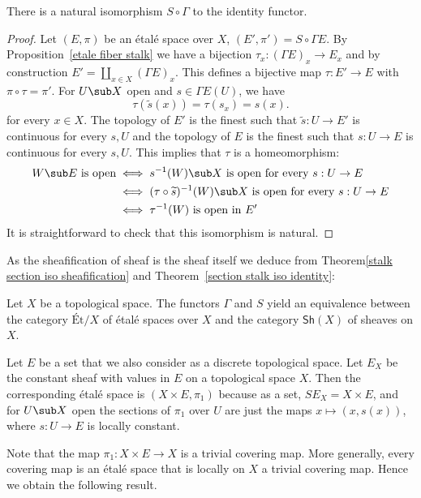 \begin{theorem}\label{section stalk iso identity}
There is a natural isomorphism $S\circ\Gamma$ to the identity functor.
\end{theorem}
\begin{proof}
Let $(E,\pi)$ be an étalé space over $X$, $(E',\pi')=S\circ\Gamma E$. By Proposition~\ref{etale fiber stalk} we have a bijection $\tau_x:(\Gamma E)_x\to E_x$ and by construction $E'=\coprod_{x\in X}(\Gamma E)_x$. This defines a bijective map $\tau:E'\to E$ with $\pi\circ\tau=\pi'$. For $U\sub X$ open and $s\in\Gamma E(U)$, we have 
\[\tau(\widetilde{s}(x))=\tau(s_x)=s(x).\] 
for every $x\in X$. The topology of $E'$ is the finest such that $\widetilde{s}:U\to E'$ is continuous for every $s,U$ and the topology of $E$ is the finest such that $s:U\to E$ is continuous for every $s,U$. This implies that $\tau$ is a homeomorphism:
\begin{align*}
W\sub E\text{ is open}&\iff s^{-1}(W)\sub X\text{ is open for every $s:U\to E$}\\
&\iff(\tau\circ\widetilde{s})^{-1}(W)\sub X\text{ is open for every $s:U\to E$}\\
&\iff\tau^{-1}(W)\text{ is open in $E'$}
\end{align*}
It is straightforward to check that this isomorphism is natural.
\end{proof}
As the sheafification of sheaf is the sheaf itself we deduce from Theorem\ref{stalk section iso sheafification} and Theorem~\ref{section stalk iso identity}:
\begin{proposition}
Let $X$ be a topological space. The functors $\Gamma$ and $S$ yield an equivalence between the category $\text{\'Et/}X$ of étalé spaces over $X$ and the category $\mathsf{Sh}(X)$ of sheaves on $X$.
\end{proposition}
\begin{example}
Let $E$ be a set that we also consider as a discrete topological space. Let $E_X$ be the constant sheaf with values in $E$ on a topological space $X$. Then the corresponding étalé space is $(X\times E,\pi_1)$ because as a set, $SE_X=X\times E$, and for $U\sub X$ open the sections of $\pi_1$ over $U$ are just the maps $x\mapsto(x,s(x))$, where $s:U\to E$ is locally constant.
\end{example}
Note that the map $\pi_1:X\times E\to X$ is a trivial covering map. More generally, every covering map is an étalé space that is locally on $X$ a trivial covering map. Hence we obtain the following result.
